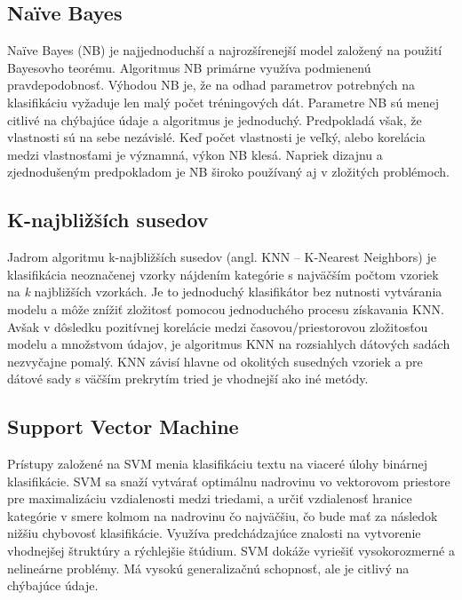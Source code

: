 \subsection*{Naïve Bayes}
Naïve Bayes (NB) je najjednoduchší a najrozšírenejší model založený na použití Bayesovho teorému. Algoritmus NB primárne využíva podmienenú pravdepodobnosť. Výhodou NB je, že na odhad parametrov potrebných na klasifikáciu vyžaduje len malý počet tréningových dát. Parametre NB sú menej citlivé na chýbajúce údaje a algoritmus je jednoduchý. Predpokladá však, že vlastnosti sú na sebe nezávislé. Keď počet vlastnosti je veľký, alebo korelácia medzi vlastnosťami je významná, výkon NB klesá. Napriek  dizajnu a zjednodušeným predpokladom je NB široko používaný aj v zložitých problémoch.

\subsection*{K-najbližších susedov}
Jadrom algoritmu k-najbližších susedov (angl. KNN -- K-Nearest Neighbors) je klasifikácia neoznačenej vzorky nájdením kategórie s najväčším počtom vzoriek na \textit{k} najbližších vzorkách. Je to jednoduchý klasifikátor bez nutnosti vytvárania modelu a môže znížiť zložitosť pomocou jednoduchého procesu získavania KNN. Avšak v dôsledku pozitívnej korelácie medzi časovou/priestorovou zložitosťou modelu a množstvom údajov, je algoritmus KNN na rozsiahlych dátových sadách nezvyčajne pomalý. KNN závisí hlavne od okolitých susedných vzoriek a pre dátové sady s väčším prekrytím tried  je vhodnejší ako iné metódy.

\subsection*{Support Vector Machine}
Prístupy založené na SVM menia klasifikáciu textu na viaceré úlohy binárnej klasifikácie. SVM sa snaží vytvárať optimálnu nadrovinu vo vektorovom priestore pre maximalizáciu vzdialenosti medzi triedami, a určiť vzdialenosť hranice kategórie v smere kolmom na nadrovinu čo najväčšiu, čo bude mať za následok nižšiu chybovosť klasifikácie. Využíva predchádzajúce znalosti na vytvorenie vhodnejšej štruktúry a rýchlejšie štúdium. SVM dokáže vyriešiť vysokorozmerné a nelineárne problémy. Má vysokú generalizačnú schopnosť, ale je citlivý na chýbajúce údaje.

